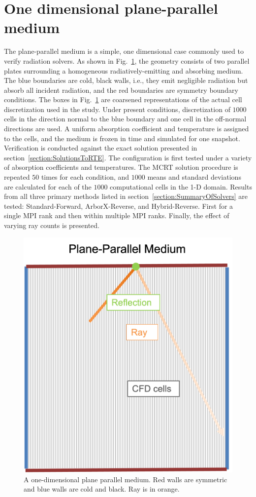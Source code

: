 \section{One dimensional plane-parallel medium}
The plane-parallel medium is a simple, one dimensional case commonly used to verify radiation solvers. As shown in Fig.~\ref{fig:PlaneParallel2}, the geometry consists of two parallel plates surrounding a homogeneous radiatively-emitting and absorbing medium. The blue boundaries are cold, black walls, i.e., they emit negligible radiation but absorb all incident radiation, and the red boundaries are symmetry boundary conditions. The boxes in Fig.~\ref{fig:PlaneParallel2} are coarsened representations of the actual cell discretization used in the study. Under present conditions, discretization of $1000$ cells in the direction normal to the blue boundary and one cell in the off-normal directions are used. A uniform absorption coefficient and temperature is assigned to the cells, and the medium is frozen in time and simulated for one snapshot. Verification is conducted against the exact solution presented in section~\ref{section:SolutionsToRTE}. 
The configuration is first tested under a variety of absorption coefficients and temperatures.
The MCRT solution procedure is repeated $50$ times for each condition, and $1000$ means and standard deviations are calculated for each of the $1000$ computational cells in the 1-D domain.
Results from all three primary methods listed in section~\ref{section:SummaryOfSolvers} are tested: Standard-Forward, ArborX-Reverse, and Hybrid-Reverse. First for a single MPI rank and then within multiple MPI ranks. Finally, the effect of varying ray counts is presented.

\begin{figure}
\centering
\includegraphics[width=0.5\linewidth]{figures/ch4/PlaneParallel.png}
\caption{A one-dimensional plane parallel medium. Red walls are symmetric and blue walls are cold and black. Ray is in orange.}
\label{fig:PlaneParallel2}
\end{figure}

